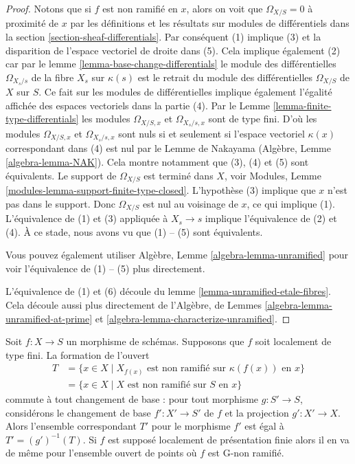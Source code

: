 \begin{proof}
Notons que si $f$ est non ramifié en
$x$, alors on voit que $\Omega_{X/S} = 0$ à proximité de
$x$ par les définitions et les résultats sur modules
de différentiels dans la section \ref{section-sheaf-differentials}. Par conséquent (1)
implique (3) et la disparition de l'espace vectoriel de droite
dans (5). Cela implique également
(2) car par le lemme \ref{lemma-base-change-differentials} le module
des différentielles $\Omega_{X_s/s}$ de la fibre $X_s$ sur
$\kappa(s)$ est le retrait du module des différentielles $\Omega_{X/S}$
de $X$ sur $S$. Ce fait sur les modules de différentielles
implique également l'égalité affichée des espaces vectoriels
dans la partie (4). Par le Lemme \ref{lemma-finite-type-differentials}
les modules $\Omega_{X/S, x}$ et $\Omega_{X_s/s, x}$ sont de type fini. D'où les modules
$\Omega_{X/S, x}$ et $\Omega_{X_s/s, x}$ sont nuls si et seulement si l'espace vectoriel
$\kappa(x)$ correspondant dans (4) est nul par le Lemme
de Nakayama (Algèbre,
Lemme \ref{algebra-lemma-NAK}). Cela montre
notamment que (3), (4) et (5) sont équivalents. Le support
de $\Omega_{X/S}$ est terminé dans $X$, voir
Modules, Lemme \ref{modules-lemma-support-finite-type-closed}. L'hypothèse (3) implique que
$x$ n'est pas dans le support. Donc $\Omega_{X/S}$
est nul au voisinage de $x$, ce qui implique
(1). L'équivalence de (1) et (3) appliquée à $X_s \to s$ implique
l'équivalence de (2) et (4).
À ce stade, nous avons vu que (1) -- (5) sont équivalents.

\medskip\noindent
Vous pouvez également utiliser Algèbre, Lemme \ref{algebra-lemma-unramified} pour voir
l'équivalence de (1) -- (5) plus directement.

\medskip\noindent
L'équivalence de (1) et (6)
découle du lemme \ref{lemma-unramified-etale-fibres}.
Cela découle aussi
plus directement de l'Algèbre, de Lemmes
\ref{algebra-lemma-unramified-at-prime} et \ref{algebra-lemma-characterize-unramified}.
\end{proof}

\begin{lemma}
\label{lemma-set-points-where-fibres-unramified}
Soit $f : X \to S$ un morphisme de schémas. Supposons
que $f$ soit localement de type fini. La formation de l'ouvert
\begin{align*}
T
& =
\{x \in X \mid X_{f(x)}\text{ est non ramifié sur }\kappa(f(x))\text{ en }x\} \\
& =
\{x \in X \mid X\text{ est non ramifié sur }S\text{ en }x\}
\end{align*}
commute à tout changement de base :
pour tout morphisme $g : S' \to S$, considérons
le changement de base $f' : X' \to S'$ de $f$
et la projection $g' : X' \to X$. Alors l'ensemble correspondant
$T'$ pour le morphisme $f'$ est égal à $T' = (g')^{-1}(T)$. Si $f$
est supposé localement de présentation finie alors il en va de même pour
l'ensemble ouvert de points où $f$ est G-non ramifié.
\end{lemma}

